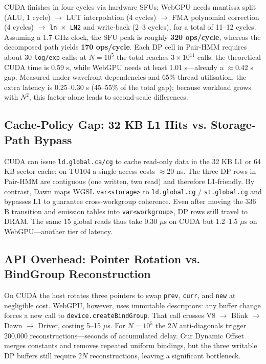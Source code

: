 \documentclass[PhD]{PHlab-thesis}
\begin{document}
CUDA finishes in four cycles via hardware SFUs; WebGPU needs mantissa split (ALU, 1 cycle) $\rightarrow$ LUT interpolation (4 cycles) $\rightarrow$ FMA polynomial correction (4 cycles) $\rightarrow$ \texttt{ln $\times$ LN2} and write-back (2–3 cycles), for a total of 11–12 cycles.
Assuming a 1.7 GHz clock, the SFU peak is roughly \textbf{320 ops/cycle}, whereas the decomposed path yields \textbf{170 ops/cycle}.
Each DP cell in Pair-HMM requires about 30 \texttt{log/exp} calls; at $N=10^5$ the total reaches $3 \times 10^{11}$ calls: the theoretical CUDA time is 0.59 s, while WebGPU needs at least 1.01 s—already a $\approx$0.42 s gap.
Measured under wavefront dependencies and 65\% thread utilisation, the extra latency is 0.25–0.30 s (45–55\% of the total gap); because workload grows with $N^2$, this factor alone leads to second-scale differences.
\subsection{Cache-Policy Gap: 32 KB L1 Hits vs. Storage-Path Bypass}
CUDA can issue \texttt{ld.global.ca/cg} to cache read-only data in the 32 KB L1 or 64 KB sector cache; on TU104 a single access costs $\approx$20 ns.
The three DP rows in Pair-HMM are contiguous (one written, two read) and therefore L1-friendly.
By contrast, Dawn maps WGSL \texttt{var<storage>} to \texttt{ld.global.cg} / \texttt{st.global.cg} and bypasses L1 to guarantee cross-workgroup coherence.
Even after moving the 336 B transition and emission tables into \texttt{var<workgroup>}, DP rows still travel to DRAM.
The same 15 global reads thus take 0.30 $\mu$s on CUDA but 1.2–1.5 $\mu$s on WebGPU—another tier of latency.

\subsection{API Overhead: Pointer Rotation vs. BindGroup Reconstruction}
On CUDA the host rotates three pointers to swap \texttt{prev}, \texttt{curr}, and \texttt{new} at negligible cost.
WebGPU, however, uses immutable descriptors: any buffer change forces a new call to \texttt{device.createBindGroup}.
That call crosses V8 $\rightarrow$ Blink $\rightarrow$ Dawn $\rightarrow$ Driver, costing 5–15 $\mu$s.
For $N=10^5$ the 2$N$ anti-diagonals trigger 200,000 reconstructions—seconds of accumulated delay.
Our Dynamic Offset merges constants and removes repeated uniform bindings, but the three writable DP buffers still require 2$N$ reconstructions, leaving a significant bottleneck.
\end{document}
